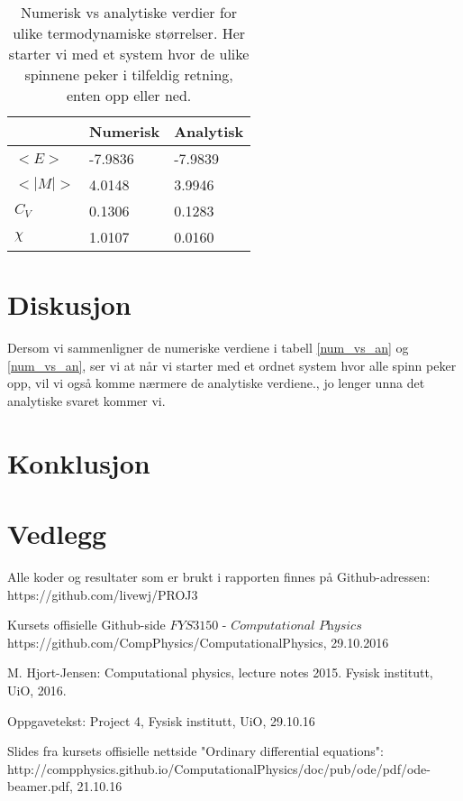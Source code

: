 \documentclass[11pt,a4paper]{article}
\begin{document}
\FloatBarrier
\begin{table}[!ht]
\centering
\caption{Numerisk vs analytiske verdier for ulike termodynamiske størrelser. Her starter vi med et system hvor de ulike spinnene peker i tilfeldig retning, enten opp eller ned.}
\label{num_vs_an2}
\begin{tabular}{|l|l|l|}
\hline
        & Numerisk & Analytisk \\ \hline
$<E>$   & -7.9836  & -7.9839   \\ \hline
$<|M|>$ & 4.0148   & 3.9946    \\ \hline
$C_V$   & 0.1306   & 0.1283    \\ \hline
$\chi$  & 1.0107   & 0.0160    \\ \hline
\end{tabular}
\end{table}
\FloatBarrier



\section{Diskusjon}
Dersom vi sammenligner de numeriske verdiene i tabell \ref{num_vs_an} og \ref{num_vs_an}, ser vi at når vi starter med et ordnet system hvor alle spinn peker opp, vil vi også komme nærmere de analytiske verdiene., jo lenger unna det analytiske svaret kommer vi. 

\section{Konklusjon}

\section{Vedlegg}
Alle koder og resultater som er brukt i rapporten finnes på Github-adressen: \\
https://github.com/livewj/PROJ3



\begin{thebibliography}{9}  

\bibitem{}
  Kursets offisielle Github-side $\textit{FYS3150 - Computational Physics}$
  https://github.com/CompPhysics/ComputationalPhysics,
  29.10.2016  
    
\bibitem{}
   M. Hjort-Jensen: Computational physics, lecture notes 2015. Fysisk institutt, UiO, 2016.

\bibitem{}
   Oppgavetekst: Project 4, Fysisk institutt, UiO, 29.10.16
    
\bibitem{}
  Slides fra kursets offisielle nettside
  "Ordinary differential equations":
  http://compphysics.github.io/ComputationalPhysics/doc/pub/ode/pdf/ode-beamer.pdf, 21.10.16


   
\end{thebibliography}
\end{document}

